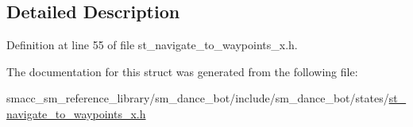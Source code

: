 \subsection{Detailed Description}


Definition at line 55 of file st\+\_\+navigate\+\_\+to\+\_\+waypoints\+\_\+x.\+h.



The documentation for this struct was generated from the following file\+:\begin{DoxyCompactItemize}
\item 
smacc\+\_\+sm\+\_\+reference\+\_\+library/sm\+\_\+dance\+\_\+bot/include/sm\+\_\+dance\+\_\+bot/states/\hyperlink{st__navigate__to__waypoints__x_8h}{st\+\_\+navigate\+\_\+to\+\_\+waypoints\+\_\+x.\+h}\end{DoxyCompactItemize}
